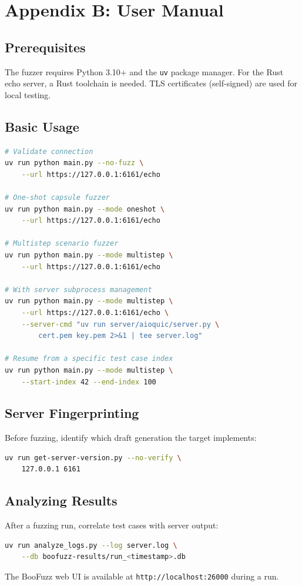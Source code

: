 \chapter*{Appendix B: User Manual}

\section*{Prerequisites}

The fuzzer requires Python 3.10+ and the \texttt{uv} package manager. For the Rust echo server, a Rust toolchain is needed. TLS certificates (self-signed) are used for local testing.

\section*{Basic Usage}

\begin{lstlisting}[language=bash,frame=single]
# Validate connection
uv run python main.py --no-fuzz \
    --url https://127.0.0.1:6161/echo

# One-shot capsule fuzzer
uv run python main.py --mode oneshot \
    --url https://127.0.0.1:6161/echo

# Multistep scenario fuzzer
uv run python main.py --mode multistep \
    --url https://127.0.0.1:6161/echo

# With server subprocess management
uv run python main.py --mode multistep \
    --url https://127.0.0.1:6161/echo \
    --server-cmd "uv run server/aioquic/server.py \
        cert.pem key.pem 2>&1 | tee server.log"

# Resume from a specific test case index
uv run python main.py --mode multistep \
    --start-index 42 --end-index 100
\end{lstlisting}

\section*{Server Fingerprinting}

Before fuzzing, identify which draft generation the target implements:

\begin{lstlisting}[language=bash,frame=single]
uv run get-server-version.py --no-verify \
    127.0.0.1 6161
\end{lstlisting}

\section*{Analyzing Results}

After a fuzzing run, correlate test cases with server output:

\begin{lstlisting}[language=bash,frame=single]
uv run analyze_logs.py --log server.log \
    --db boofuzz-results/run_<timestamp>.db
\end{lstlisting}

The BooFuzz web UI is available at \texttt{http://localhost:26000} during a run.
